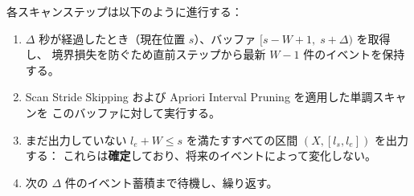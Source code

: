 各スキャンステップは以下のように進行する：

\begin{enumerate}
  \item $\Delta$ 秒が経過したとき（現在位置 $s$）、バッファ $[s - W + 1,\; s + \Delta)$ を取得し、
        境界損失を防ぐため直前ステップから最新 $W{-}1$ 件のイベントを保持する。
  \item Scan Stride Skipping および Apriori Interval Pruning を適用した単調スキャンを
        このバッファに対して実行する。
  \item まだ出力していない $l_e + W \leq s$ を満たすすべての区間 $(X, [l_s, l_e])$ を出力する：
        これらは\textbf{確定}しており、将来のイベントによって変化しない。
  \item 次の $\Delta$ 件のイベント蓄積まで待機し、繰り返す。
\end{enumerate}
